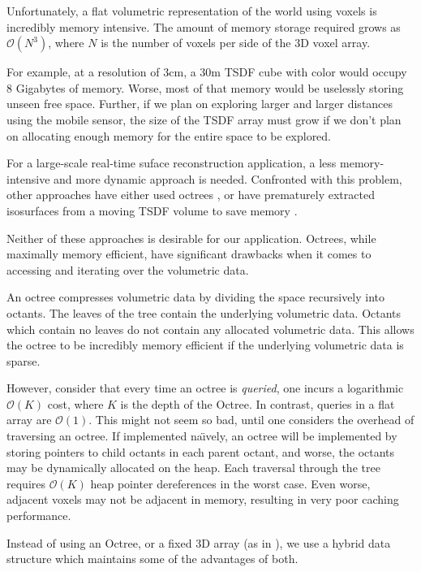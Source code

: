 \documentclass[10pt,twocolumn,letterpaper]{article}
\begin{document}
Unfortunately, a flat volumetric representation of the world using voxels is
incredibly memory intensive. The amount of memory storage required grows as
$\mathcal{O}(N^3)$, where $N$ is the number of voxels per side of the 3D voxel
array.

For example, at a resolution of $3\text{cm}$,  a $30\text{m}$ TSDF cube with
color would occupy 8 Gigabytes of memory. Worse, most of that memory would be
uselessly storing unseen free space. Further, if we plan on exploring larger and larger
distances using the mobile sensor, the size of the TSDF array must grow if we
don't plan on allocating enough memory for the entire space to be explored.

For a large-scale real-time suface reconstruction application, a less
memory-intensive and more dynamic approach is needed. Confronted with this
problem, other approaches have either used  octrees \cite{Wurm2010}, or have
prematurely extracted isosurfaces from a moving TSDF volume to save memory
\cite{Whelan2013}.

Neither of these approaches is desirable for our application. Octrees, while
maximally memory efficient, have significant drawbacks when it comes to
accessing and iterating over the volumetric data.

An octree compresses volumetric data by dividing the space recursively into
octants. The leaves of the tree contain the underlying volumetric data. Octants
which contain no leaves do not contain any allocated volumetric data. This
allows the octree to be incredibly memory efficient if the underlying
volumetric data is sparse.

However, consider that every time an octree is \emph{queried}, one incurs a
logarithmic $\mathcal{O}(K)$ cost, where $K$ is the depth of the Octree. In
contrast, queries in a flat array are $\mathcal{O}(1)$. This might not seem so
bad, until one considers the overhead of traversing an octree. If implemented na\"{\i}vely, an
octree will be implemented by storing pointers to child octants in each parent
octant, and worse, the octants may be dynamically allocated on the heap. Each
traversal through the tree requires $\mathcal{O}(K)$ heap pointer
dereferences in the worst case. Even worse, adjacent voxels may not be adjacent
in memory, resulting in very poor caching performance.

Instead of using an Octree, or a fixed 3D array (as in \cite{Newcombe,
Whelan2013}), we use a hybrid data structure which maintains some of the
advantages of both. 
\end{document}
